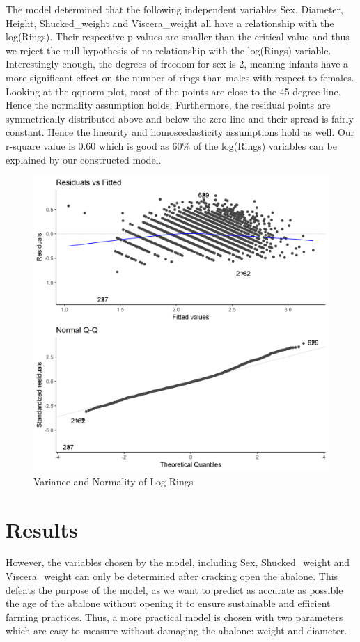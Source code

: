 \documentclass[10pt,twocolumn]{article}
\begin{document}
	The model determined that the following independent variables Sex, Diameter, Height, Shucked\_weight and Viscera\_weight all have a relationship with the log(Rings). Their respective p-values are smaller than the critical value and thus we reject the null hypothesis of no relationship with the log(Rings) variable. Interestingly enough, the degrees of freedom for sex is 2, meaning infants have a more significant effect on the number of rings than males with respect to females. Looking at the qqnorm plot, most of the points are close to the 45 degree line. Hence the normality assumption holds. Furthermore, the residual points are symmetrically distributed above and below the zero line and their spread is fairly constant. Hence the linearity and homoscedasticity assumptions hold as well. Our r-square value is 0.60 which is good as 60\% of the log(Rings) variables can be explained by our constructed model.
	
	
	\begin{figure}[!htbp]
		\centering
		\includegraphics[width=0.7\linewidth]{varnorm}
		\caption{Variance and Normality of Log-Rings}
		\label{fig:varnorm}
	\end{figure}
	\vspace{-8mm}	
	
	\section{Results}
		However, the variables chosen by the model, including Sex, Shucked\_weight and Viscera\_weight can only be determined after cracking open the abalone. This defeats the purpose of the model, as we want to predict as accurate as possible the age of the abalone without opening it to ensure sustainable and efficient farming practices. Thus, a more practical model is chosen with two parameters which are easy to measure without damaging the abalone: weight and diameter. 
		
\end{document}
